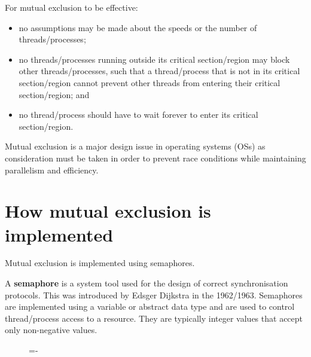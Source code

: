 \documentclass[a4paper]{systems-software}
\begin{document}
\newpage

For mutual exclusion to be effective:
\begin{itemize}
	\item no assumptions may be made about the speeds or the number of threads/processes;
	\item no threads/processes running outside its critical section/region may block other threads/processes, such that a thread/process that is not in its critical section/region cannot prevent other threads from entering their critical section/region; and
	\item no thread/process should have to wait forever to enter its critical section/region.
\end{itemize}

Mutual exclusion is a major design issue in operating systems (OSs) as consideration must be taken in order to prevent race conditions while maintaining parallelism and efficiency.


\section*{How mutual exclusion is implemented}

Mutual exclusion is implemented using semaphores.

A \textbf{semaphore} is a system tool used for the design of correct synchronisation protocols. This was introduced by Edsger Dijkstra in the 1962/1963. Semaphores are implemented using a variable or abstract data type and are used to control thread/process access to a resource. They are typically integer values that accept only non-negative values.

\begin{figure}[H]
  \lineskip=-\fboxrule
\end{figure}
\end{document}
